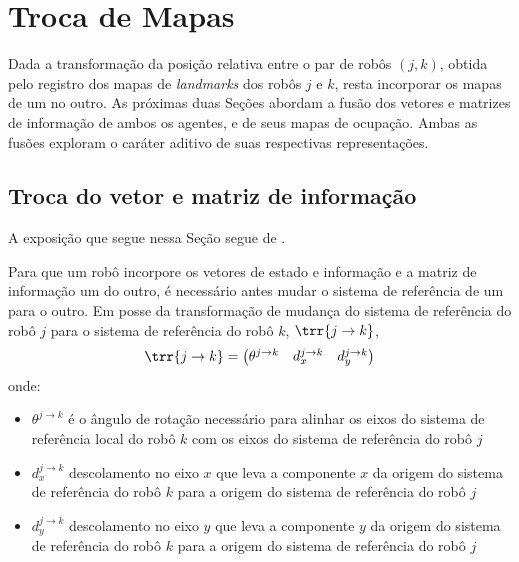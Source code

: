 
\section{Troca de Mapas}
\label{sec:seif-map-exchange}

Dada a transformação da posição relativa entre o par de robôs $(j, k)$, 
obtida pelo registro dos mapas de \textit{landmarks} dos robôs $j$ e 
$k$, resta incorporar os mapas de um no outro. As próximas duas Seções abordam 
a fusão dos vetores e matrizes de informação de ambos os agentes, e de seus 
mapas de ocupação. Ambas as fusões exploram o caráter aditivo de suas 
respectivas representações.

\subsection{Troca do vetor e matriz de informação}
\label{sec:seif-info-exchange}
A exposição que segue nessa Seção segue de \cite[Seção~12.11]{thrun2005probabilistic}. 

Para que um robô incorpore os vetores de estado e informação e a matriz 
de informação um do outro, é necessário antes mudar o sistema de 
referência de um para o outro. Em posse da transformação de mudança do 
sistema de referência do robô $j$ para o sistema de referência do robô 
$k$, $\trr{j\to k}$, 
\begin{equation}
  \trr{j \to k} = \begin{pmatrix}
    \theta^{j\to k} & d_x^{j\to k} & d_y^{j\to k}
  \end{pmatrix}
\end{equation}
onde:
\begin{itemize}
  \item $\theta^{j\to k}$ é o ângulo de rotação necessário para alinhar 
os eixos do sistema de referência local do robô $k$ com os eixos do 
sistema de referência do robô $j$
  \item $d_x^{j\to k}$ descolamento no eixo $x$ que leva a componente $x$ 
da origem do sistema de referência do robô $k$ para a origem do 
sistema de referência do robô $j$
  \item $d_y^{j\to k}$ descolamento no eixo $y$ que leva a componente $y$ 
da origem do sistema de referência do robô $k$ para a origem do 
sistema de referência do robô $j$
\end{itemize}

